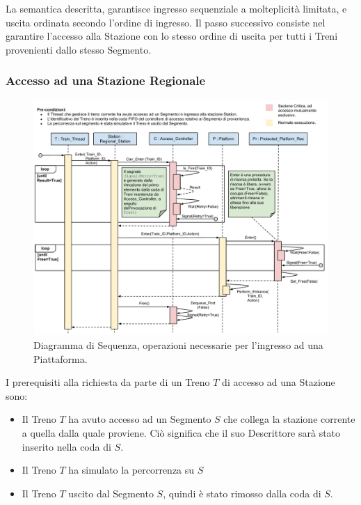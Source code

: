 	La semantica descritta, garantisce ingresso sequenziale a molteplicità limitata, e uscita ordinata secondo l'ordine di ingresso. Il passo successivo consiste nel garantire l'accesso alla Stazione con lo stesso ordine di uscita per tutti i Treni provenienti dallo stesso Segmento.


		\subsubsection{Accesso ad una Stazione Regionale}\label{subsubsec:regional_station_access}
		
		\begin{figure}[htbp]
			\includegraphics[trim = 40mm 0mm 0mm 0mm,scale=0.5]{imgs/platform_access_Sequence_Diagram.pdf}
			\caption{\footnotesize{Diagramma di Sequenza, operazioni necessarie per l'ingresso ad una Piattaforma.}}
			\label{fig:platform_access}
		\end{figure}
		
		I prerequisiti alla richiesta da parte di un Treno $T$ di accesso ad una Stazione sono:
		
			\begin{itemize}
				\item Il Treno $T$ ha avuto accesso ad un Segmento $S$ che collega la stazione corrente a quella dalla quale proviene. Ciò significa che il suo Descrittore sarà stato inserito nella coda  di $S$.
				\item Il Treno $T$ ha simulato la percorrenza su $S$ 
				\item Il Treno $T$ uscito dal Segmento $S$, quindi è stato rimosso dalla coda  di $S$.
			\end{itemize}
			
